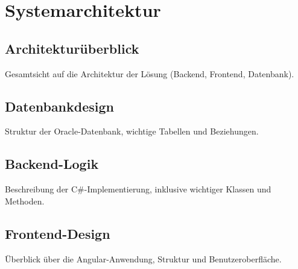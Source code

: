\chapter{Systemarchitektur}

\section{Architekturüberblick}
Gesamtsicht auf die Architektur der Lösung (Backend, Frontend, Datenbank).

\section{Datenbankdesign}
Struktur der Oracle-Datenbank, wichtige Tabellen und Beziehungen.

\section{Backend-Logik}
Beschreibung der C\#-Implementierung, inklusive wichtiger Klassen und Methoden.

\section{Frontend-Design}
Überblick über die Angular-Anwendung, Struktur und Benutzeroberfläche.